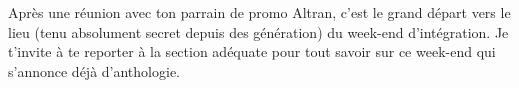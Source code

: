 Après une réunion avec ton parrain de promo Altran, c'est le grand départ
vers le lieu (tenu absolument secret depuis des génération) du week-end
d'intégration. Je t'invite à te reporter à la section adéquate pour tout
savoir sur ce week-end qui s'annonce déjà d'anthologie. 
